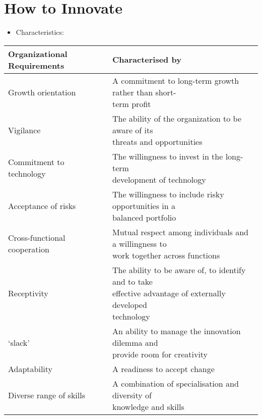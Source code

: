 \documentclass[openany,12pt,a4paper]{book}
\begin{document}
\section{How to Innovate}
\begin{itemize}
    \item Characteristics:
\end{itemize}
\begin{table}[H]
    \centering
    \begin{tabular}{ll}
        \toprule
        \textbf{Organizational Requirements}&\textbf{Characterised by}\\
        \midrule
        Growth orientation & \makecell[l]{A commitment to long-term growth rather than short-\\term profit}\\\hline
        Vigilance & \makecell[l]{The ability of the organization to be aware of its\\threats and opportunities}\\\hline
        Commitment to technology & \makecell[l]{The willingness to invest in the long-term\\development of technology}\\\hline
        Acceptance of risks & \makecell[l]{The willingness to include risky opportunities in a\\balanced portfolio}\\\hline
        Cross-functional cooperation & \makecell[l]{Mutual respect among individuals and a willingness to\\work together across functions}\\\hline
        Receptivity & \makecell[l]{The ability to be aware of, to identify and to take\\effective advantage of externally developed\\technology}\\\hline
        `slack' & \makecell[l]{An ability to manage the innovation dilemma and\\provide room for creativity}\\\hline
        Adaptability & A readiness to accept change\\\hline
        Diverse range of skills & \makecell[l]{A combination of specialisation and diversity of\\knowledge and skills}\\
        \bottomrule
    \end{tabular}
\end{table}
\end{document}
